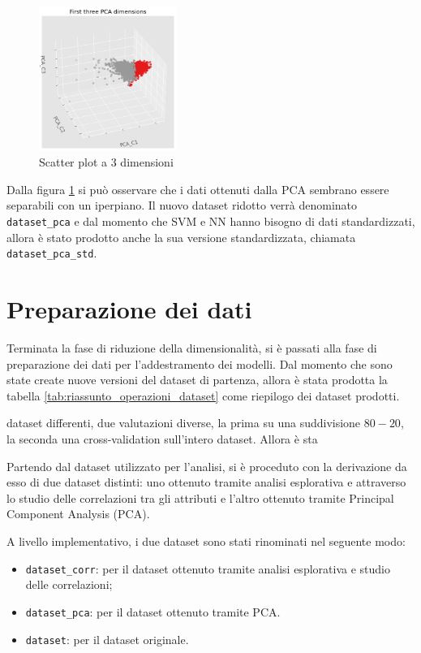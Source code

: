 \begin{figure}[!ht]
      \centering
      \includegraphics[width=0.4\textwidth]{img/analisi/pcaNuovoDataset.png}
      \caption{Scatter plot a 3 dimensioni}
      \label{fig:pca-3d}
\end{figure}

Dalla figura \ref{fig:pca-3d} si può osservare che i dati ottenuti dalla PCA
sembrano essere separabili con un iperpiano. Il nuovo dataset ridotto verrà 
denominato \texttt{dataset\_pca} e dal momento che SVM e NN hanno bisogno di dati
standardizzati, allora è stato prodotto anche la sua versione standardizzata,
chiamata \texttt{dataset\_pca\_std}.

\section{Preparazione dei dati} \label{sec:preparazione_dei_dati}
Terminata la fase di riduzione della dimensionalità, si è passati alla fase di preparazione
dei dati per l'addestramento dei modelli. Dal momento che sono state create nuove
versioni del dataset di partenza, allora è stata prodotta la tabella \ref{tab:riassunto_operazioni_dataset}
come riepilogo dei dataset prodotti.

dataset differenti, due valutazioni diverse, la prima su una suddivisione $80-20$, la seconda una 
cross-validation sull'intero dataset. Allora è sta  

Partendo dal dataset utilizzato per l'analisi, si è proceduto con la derivazione
da esso di due dataset distinti: uno ottenuto tramite analisi esplorativa e
attraverso lo studio delle correlazioni tra gli attributi e l'altro ottenuto
tramite Principal Component Analysis (PCA).

A livello implementativo, i due dataset sono stati rinominati nel seguente modo:
\begin{itemize}
      \item \texttt{dataset\_corr}: per il dataset ottenuto tramite analisi
            esplorativa e studio delle correlazioni;
      \item \texttt{dataset\_pca}: per il dataset ottenuto tramite PCA.
      \item \texttt{dataset}: per il dataset originale.
\end{itemize}

